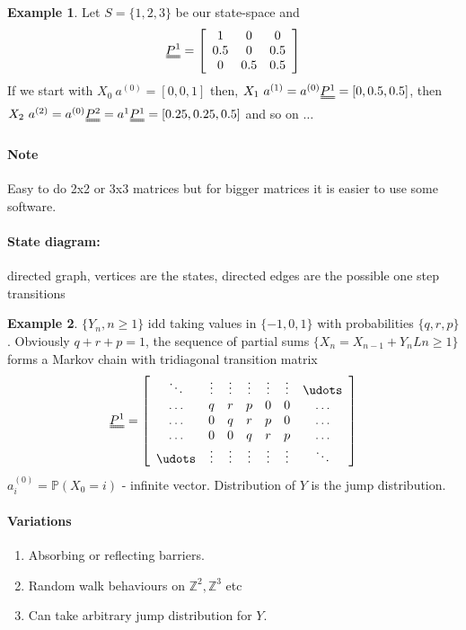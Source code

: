\documentclass{article}
\theoremstyle{definition}
\newtheorem*{ex}{Example}
\begin{document}
\begin{ex} Let $S = \{1, 2, 3\}$ be our state-space and
\[
\uuline{P^{1}} =  \left [ \begin{array}{ccc}
1 & 0 & 0\\ 0.5 & 0 & 0.5\\ 0 & 0.5 & 0.5 \end{array} \right ]
\]
If we start with $X_0 ~ a^{(0)} = [ 0,0,1 ]$ then, $X_1 ~ a^{(1)} = a^{(0)} \uuline{P^{1}} = [0,0.5,0.5]$, then $X_2 ~ a^{(2)} = a^{(0)} \uuline{P^{2}} = a^{1}\uuline{P^1} = [ 0.25, 0.25, 0.5 ]$ and so on $\ldots$
\end{ex}

\paragraph*{Note} Easy to do 2x2 or 3x3 matrices but for bigger matrices it is easier to use some software.

\paragraph*{State diagram:} directed graph, vertices are the states, directed edges are the possible one step transitions

\begin{ex} $\{Y_n, n \geq 1 \}$ idd taking values in $\{-1, 0, 1\}$ with probabilities $\{q, r, p\}$. Obviously $q + r + p = 1$, the sequence of partial sums $\{X_n = X_{n-1} + Y_n L n \geq 1\}$ forms a Markov chain with tridiagonal transition matrix
\[
\uuline{P^1} = \left [ \begin{array}{ccccccc}
\ddots & \vdots & \vdots & \vdots & \vdots & \vdots & \udots\\
\hdots & q & r & p & 0 & 0 & \hdots\\
\hdots & 0 & q & r & p & 0 & \hdots\\
\hdots & 0 & 0 & q & r & p & \hdots\\
\udots & \vdots & \vdots & \vdots & \vdots & \vdots & \ddots\\
\end{array} \right ]
\]
$a_i^{(0)} = \mathbb{P}(X_0 = i)$ - infinite vector. Distribution of $Y$ is the jump distribution.
\end{ex}

\paragraph*{Variations}
\begin{enumerate}
\item
Absorbing or reflecting barriers.
\item
Random walk behaviours on $\mathbb{Z}^2, \mathbb{Z}^3$ etc
\item
Can take arbitrary jump distribution for $Y$.
\end{enumerate}
\end{document}
